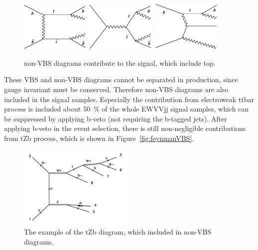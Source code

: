 \begin{figure}[H]
\begin{center}
 \includegraphics[width=0.3\textwidth,keepaspectratio]{figures/samples/feynEWKnonVBS1.pdf}
 \includegraphics[width=0.3\textwidth,keepaspectratio]{figures/samples/feynEWKnonVBS2.pdf}
 \includegraphics[width=0.3\textwidth,keepaspectratio]{figures/samples/feynEWKnonVBS7.pdf}
 \caption[f]{
non-VBS diagrams contribute to the signal, which include top.
}
\label{fig:feynmanEWKnonVBS2}
\end{center}
\end{figure}

These VBS and non-VBS diagrams cannot be separated in production, since gauge invariant must be conserved. Therefore non-VBS diagrams are also included in the signal samples. Especially the contribution from electroweak ttbar process is included about 50~\% of the whole EWVVjj signal samples, which can be suppressed by applying b-veto (not requiring the b-tagged jets). After applying b-veto in the event selection, there is still non-negligible contributions from tZb process, which is shown in Figure~\ref{fig:feynmanVBS}. 

\begin{figure}[H]
\begin{center}
\includegraphics[width=0.5\textwidth,keepaspectratio]{figures/samples/feynEWKnonVBStZb.pdf}
\caption{
The example of the tZb diagram, which included in non-VBS diagrams.
}
\label{fig:feynmantZb}
\end{center}
\end{figure}


